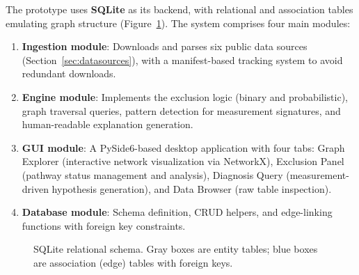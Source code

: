 \documentclass[12pt,a4paper]{article}
\begin{document}
The prototype uses \textbf{SQLite} as its backend, with relational and association tables emulating graph structure (Figure~\ref{fig:schema_sql}). The system comprises four main modules:

\begin{enumerate}
    \item \textbf{Ingestion module}: Downloads and parses six public data sources (Section~\ref{sec:datasources}), with a manifest-based tracking system to avoid redundant downloads.
    \item \textbf{Engine module}: Implements the exclusion logic (binary and probabilistic), graph traversal queries, pattern detection for measurement signatures, and human-readable explanation generation.
    \item \textbf{GUI module}: A PySide6-based desktop application with four tabs: Graph Explorer (interactive network visualization via NetworkX), Exclusion Panel (pathway status management and analysis), Diagnosis Query (measurement-driven hypothesis generation), and Data Browser (raw table inspection).
    \item \textbf{Database module}: Schema definition, CRUD helpers, and edge-linking functions with foreign key constraints.
\end{enumerate}

\begin{figure}[H]
\centering
{}
\caption{SQLite relational schema. Gray boxes are entity tables; blue boxes are association (edge) tables with foreign keys.}
\label{fig:schema_sql}
\end{figure}
\end{document}
